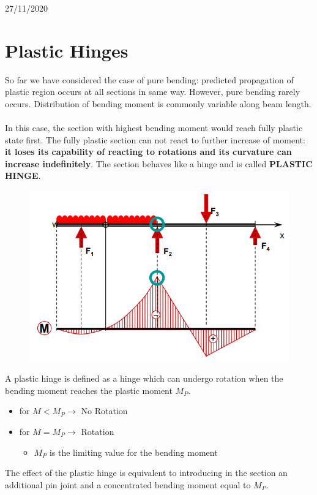 \documentclass[class=report, crop=false, 12pt,a4paper]{standalone}
\begin{document}
\begin{center}
  27/11/2020
\end{center}
\section{Plastic Hinges}
So far we have considered the case of pure bending: predicted propagation of plastic region occurs at all sections in same way. However, pure bending rarely occurs. Distribution of bending moment is commonly variable along beam length. \\\\
In this case, the section with highest bending moment would reach fully plastic state first. The fully plastic section can not react to further increase of moment: \textbf{it loses its capability of reacting to rotations and its curvature can increase indefinitely}. The section behaves like a hinge and is called \textbf{PLASTIC HINGE}.
\begin{figure}[H]
  \centering
  \includegraphics[width = 0.6 \textwidth]{../img/beam21.PNG}
\end{figure}
A plastic hinge is defined as a hinge which can undergo rotation when the bending moment reaches the plastic moment $M_P$.
\begin{itemize}
  \item for $M<M_P \longrightarrow$ No Rotation
  \item for $M=M_P \longrightarrow$ Rotation
  \begin{itemize}
    \item $M_P$ is the limiting value for the bending moment
  \end{itemize}
\end{itemize}
The effect of the plastic hinge is equivalent to introducing in the section an additional pin joint and a concentrated bending moment equal to $M_P$.
\end{document}
